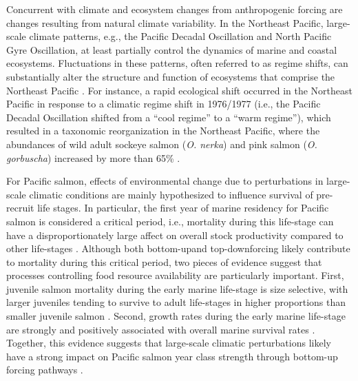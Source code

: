 Concurrent with climate and ecosystem changes from anthropogenic forcing are
changes resulting from natural climate variability. In the Northeast Pacific,
large-scale climate patterns, e.g., the Pacific Decadal Oscillation and North
Pacific Gyre Oscillation, at least partially control the dynamics of marine and
coastal ecosystems. Fluctuations in these patterns, often referred to as regime
shifts, can substantially alter the structure and function of ecosystems that
comprise the Northeast Pacific \citep{Chavez2003a}. For instance, a rapid
ecological shift occurred in the Northeast Pacific in response to a climatic
regime shift in 1976/1977 (i.e., the Pacific Decadal Oscillation shifted from a
``cool regime'' to a ``warm regime''), which resulted in a taxonomic
reorganization in the Northeast Pacific, where the abundances of wild adult
sockeye salmon (\emph{O. nerka}) and pink salmon (\emph{O. gorbuscha}) increased
by more than 65\% \citep{Ruggerone2010a, Anderson1999a, Mueter2000a}.

For Pacific salmon, effects of environmental change due to perturbations in
large-scale climatic conditions are mainly hypothesized to influence survival of
pre-recruit life stages. In particular, the first year of marine residency for
Pacific salmon is considered a critical period, i.e., mortality during this
life-stage can have a disproportionately large affect on overall stock
productivity compared to other life-stages \citep{Parker1968a, Peterman1985a,
Beamish2001a, Wertheimer2007a}. Although both bottom-up\footnotemark[2] and
top-down\footnotemark[3] forcing likely contribute to mortality during this
critical period, two pieces of evidence suggest that processes controlling food
resource availability are particularly important. First, juvenile salmon
mortality during the early marine life-stage is size selective, with larger
juveniles tending to survive to adult life-stages in higher proportions than
smaller juvenile salmon \citep{Parker1971a, Holtby1990a, McGurk1996a,
Moss2005a}. Second, growth rates during the early marine life-stage are strongly
and positively associated with overall marine survival rates \citep{Cross2008a,
Duffy2011, Farley2007b}. Together, this evidence suggests that large-scale
climatic perturbations likely have a strong impact on Pacific salmon year class
strength through bottom-up forcing pathways \citep{Perry1996a, Armstrong2005a}.


